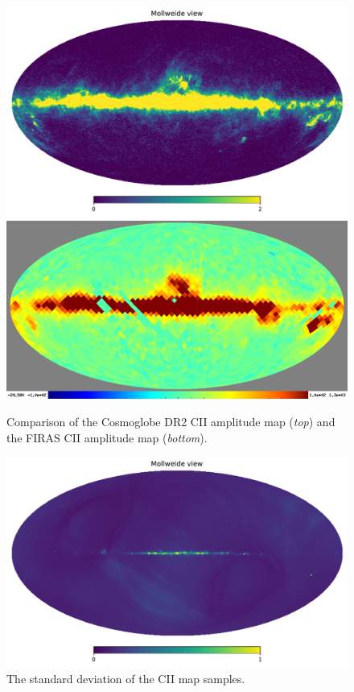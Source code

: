 \documentclass{aa}
\begin{document}
\begin{figure}
    \centering
    \includegraphics[width=\textwidth]{figures/cii_meanmap.pdf}\\
    \includegraphics[width=\textwidth]{figures/CII_FIRAS_v1_n16.png}    
    \caption{Comparison of the Cosmoglobe DR2 CII amplitude map (\emph{top}) and the FIRAS CII amplitude map (\emph{bottom}).}
    \label{fig:cii_mean}
\end{figure}

\begin{figure}
    \centering
    \includegraphics[width=\columnwidth]{figures/cii_stdmap.pdf}
    \caption{The standard deviation of the CII map samples.}
    \label{fig:cii_std}
\end{figure}
\end{document}
